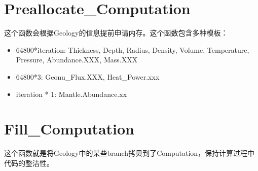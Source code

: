 	\section{Preallocate\_Computation}
		这个函数会根据Geology的信息提前申请内存。这个函数包含多种模板：
			\begin{itemize}
				\item 64800*iteration: Thickness, Depth, Radius, Density, Volume, Temperature, Pressure, Abundance.XXX, Mass.XXX
				\item 64800*3:  Geonu\_Flux.XXX, Heat\_Power.xxx
				\item iteration * 1: Mantle.Abundance.xx
			\end{itemize}
	\section{Fill\_Computation}
		这个函数就是将Geology中的某些branch拷贝到了Computation，保持计算过程中代码的整洁性。

